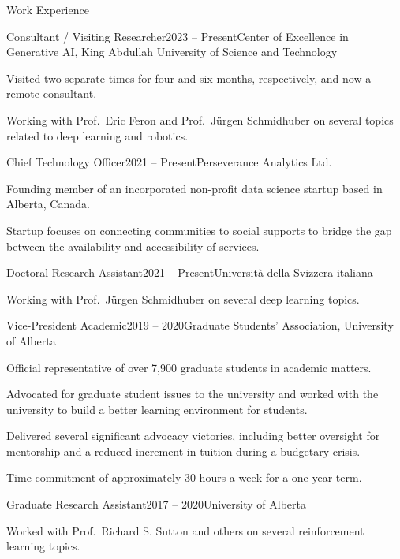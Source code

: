 \documentclass{cv}
\begin{document}
\begin{rSection}{Work Experience}

\begin{rSubsection}{Consultant / Visiting Researcher}{2023 -- Present}{Center of Excellence in Generative AI, King Abdullah University of Science and Technology}
    \item Visited two separate times for four and six months, respectively, and now a remote consultant.
    \item Working with Prof.\ Eric Feron and Prof.\ J{\"{u}}rgen Schmidhuber on several topics related to deep learning and robotics.
\end{rSubsection}

\begin{rSubsection}{Chief Technology Officer}{2021 -- Present}{Perseverance Analytics Ltd.}
    \item Founding member of an incorporated non-profit data science startup based in Alberta, Canada.
    \item Startup focuses on connecting communities to social supports to bridge the gap between the availability and accessibility of services.
\end{rSubsection}

\begin{rSubsection}{Doctoral Research Assistant}{2021 -- Present}{Universit{\`{a}} della Svizzera italiana}
    \item Working with Prof.\ J{\"{u}}rgen Schmidhuber on several deep learning topics.
\end{rSubsection}

\begin{rSubsection}{Vice-President Academic}{2019 -- 2020}{Graduate Students' Association, University of Alberta}
    \item Official representative of over 7,900 graduate students in academic matters.
    \item Advocated for graduate student issues to the university and worked with the university to build a better learning environment for students.
    \item Delivered several significant advocacy victories, including better oversight for mentorship and a reduced increment in tuition during a budgetary crisis.
    \item Time commitment of approximately 30 hours a week for a one-year term.
\end{rSubsection}

\begin{rSubsection}{Graduate Research Assistant}{2017 -- 2020}{University of Alberta}
    \item Worked with Prof.\ Richard S. Sutton and others on several reinforcement learning topics.
\end{rSubsection}


\end{rSection}
\end{document}
